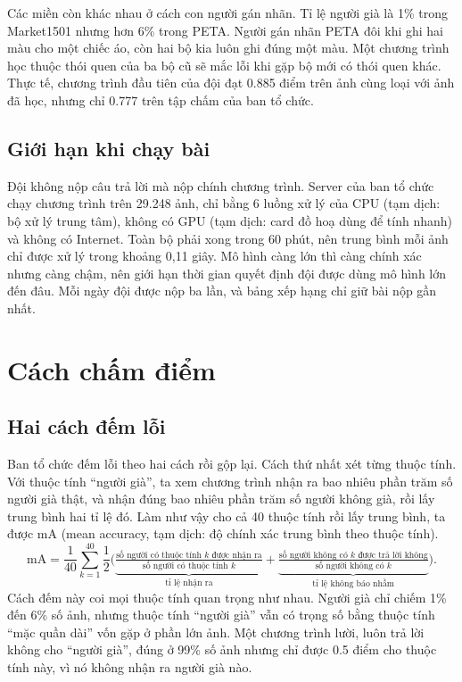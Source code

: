 \documentclass[11pt,a4paper]{article}
\begin{document}
Các miền còn khác nhau ở cách con người gán nhãn. Tỉ lệ người già là 1\% trong Market1501 nhưng hơn 6\% trong PETA. Người gán nhãn PETA đôi khi ghi hai màu cho một chiếc áo, còn hai bộ kia luôn ghi đúng một màu. Một chương trình học thuộc thói quen của ba bộ cũ sẽ mắc lỗi khi gặp bộ mới có thói quen khác. Thực tế, chương trình đầu tiên của đội đạt 0.885 điểm trên ảnh cùng loại với ảnh đã học, nhưng chỉ 0.777 trên tập chấm của ban tổ chức.

\subsection{Giới hạn khi chạy bài}

Đội không nộp câu trả lời mà nộp chính chương trình. Server của ban tổ chức chạy chương trình trên 29.248 ảnh, chỉ bằng 6 luồng xử lý của CPU (tạm dịch: bộ xử lý trung tâm), không có GPU (tạm dịch: card đồ hoạ dùng để tính nhanh) và không có Internet. Toàn bộ phải xong trong 60 phút, nên trung bình mỗi ảnh chỉ được xử lý trong khoảng 0,11 giây. Mô hình càng lớn thì càng chính xác nhưng càng chậm, nên giới hạn thời gian quyết định đội được dùng mô hình lớn đến đâu. Mỗi ngày đội được nộp ba lần, và bảng xếp hạng chỉ giữ bài nộp gần nhất.

\section{Cách chấm điểm}
\label{sec:metrics}

\subsection{Hai cách đếm lỗi}

Ban tổ chức đếm lỗi theo hai cách rồi gộp lại. Cách thứ nhất xét từng thuộc tính. Với thuộc tính ``người già'', ta xem chương trình nhận ra bao nhiêu phần trăm số người già thật, và nhận đúng bao nhiêu phần trăm số người không già, rồi lấy trung bình hai tỉ lệ đó. Làm như vậy cho cả 40 thuộc tính rồi lấy trung bình, ta được mA (mean accuracy, tạm dịch: độ chính xác trung bình theo thuộc tính).
\begin{equation}
\mathrm{mA}=\frac{1}{40}\sum_{k=1}^{40}\frac12\Big(\underbrace{\tfrac{\text{số người có thuộc tính }k\text{ được nhận ra}}{\text{số người có thuộc tính }k}}_{\text{tỉ lệ nhận ra}}+\underbrace{\tfrac{\text{số người không có }k\text{ được trả lời không}}{\text{số người không có }k}}_{\text{tỉ lệ không báo nhầm}}\Big).
\end{equation}
Cách đếm này coi mọi thuộc tính quan trọng như nhau. Người già chỉ chiếm 1\% đến 6\% số ảnh, nhưng thuộc tính ``người già'' vẫn có trọng số bằng thuộc tính ``mặc quần dài'' vốn gặp ở phần lớn ảnh. Một chương trình lười, luôn trả lời không cho ``người già'', đúng ở 99\% số ảnh nhưng chỉ được 0.5 điểm cho thuộc tính này, vì nó không nhận ra người già nào.
\end{document}
